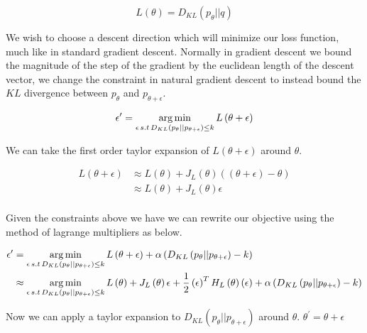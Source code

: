 \documentclass[12pt, a4paper]{report}
\theoremstyle{definition}
\theoremstyle{definition}
\theoremstyle{definition}
\begin{document}
$$L \left(\theta \right) = D_{KL} \left(p_\theta || q \right) $$

We wish to choose a descent direction which will minimize our loss function, much like in standard gradient descent. Normally in gradient descent we bound the magnitude of the step of the gradient by the euclidean length of the descent vector, we change the constraint in natural gradient descent to instead bound the $KL$ divergence between $p_\theta$ and $p_{\theta + \epsilon}$.

\begin{align}
    \epsilon^\prime &= \operatorname*{arg\,min}_{\epsilon \, s.t \, D_{KL} \left(p_\theta || p_{\theta + \epsilon} \right) \leq k} L \left( \theta + \epsilon \right) \\
\end{align}

We can take the first order taylor expansion of $L\left(\theta + \epsilon\right)$ around $\theta$.


\begin{align*}
L\left(\theta + \epsilon\right) &\approx L\left( \theta \right) + J_L \left( \theta\right) \left( \left( \theta + \epsilon \right) - \theta \right)  \\
&\approx L\left( \theta \right) +  J_L \left( \theta\right) \epsilon \\
\end{align*}

Given the constraints above we have we can rewrite our objective using the method of lagrange multipliers as below.


\begin{align}
    \epsilon^\prime &= \operatorname*{arg\,min}_{\epsilon \, s.t \, D_{KL} \left(p_\theta || p_{\theta + \epsilon} \right) \leq k} L \left( \theta + \epsilon \right) + \alpha \left( D_{KL} \left(p_\theta || p_{\theta + \epsilon} \right) - k\right) \\
    &\approx \operatorname*{arg\,min}_{\epsilon \, s.t \, D_{KL} \left(p_\theta || p_{\theta + \epsilon} \right) \leq k}  L\left( \theta \right) +  J_L \left( \theta\right) \epsilon  + \frac{1}{2} \left(\epsilon \right)^T H_L \left(\theta \right) \left( \epsilon\right) + \alpha \left( D_{KL} \left(p_\theta || p_{\theta + \epsilon} \right) - k\right) \\
\end{align}

Now we can apply a taylor expansion to $D_{KL} \left(p_\theta || p_{\theta + \epsilon} \right)$ around $\theta$. $\theta^\prime = \theta + \epsilon$
\end{document}
